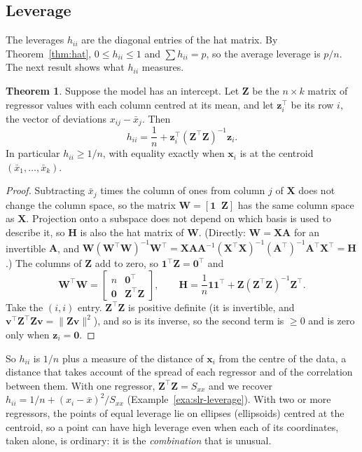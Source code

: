 \documentclass[11pt,a4paper]{article}
\numberwithin{equation}{section}
\theoremstyle{definition}
\newtheorem{thm}{Theorem}[subsection]
\begin{document}
\subsection{Leverage}
The leverages $h_{ii}$ are the diagonal entries of the hat matrix. By
Theorem~\ref{thm:hat}, $0 \le h_{ii} \le 1$ and $\sum h_{ii} = p$, so the average leverage
is $p/n$. The next result shows what $h_{ii}$ measures.

\begin{thm}\label{thm:centred-leverage}
Suppose the model has an intercept. Let $\mathbf{Z}$ be the $n \times k$ matrix of
regressor values with each column centred at its mean, and let $\mathbf{z}_i^\top$ be its
row $i$, the vector of deviations $x_{ij} - \bar x_j$. Then
\[
h_{ii} = \frac{1}{n} + \mathbf{z}_i^\top(\mathbf{Z}^\top\mathbf{Z})^{-1}\mathbf{z}_i .
\]
In particular $h_{ii} \ge 1/n$, with equality exactly when $\mathbf{x}_i$ is at the centroid
$(\bar x_1, \dots, \bar x_k)$.
\end{thm}

\begin{proof}
Subtracting $\bar x_j$ times the column of ones from column $j$ of $\mathbf{X}$ does not change
the column space, so the matrix $\mathbf{W} = [\mathbf{1} \;\; \mathbf{Z}]$ has the same column
space as $\mathbf{X}$. Projection onto a subspace does not depend on which basis is used to
describe it, so $\mathbf{H}$ is also the hat matrix of $\mathbf{W}$. (Directly: $\mathbf{W} = \mathbf{XA}$
for an invertible $\mathbf{A}$, and
$\mathbf{W}(\mathbf{W}^\top\mathbf{W})^{-1}\mathbf{W}^\top = \mathbf{XA}\mathbf{A}^{-1}(\mathbf{X}^\top\mathbf{X})^{-1}(\mathbf{A}^\top)^{-1}\mathbf{A}^\top\mathbf{X}^\top = \mathbf{H}$.)
The columns of $\mathbf{Z}$ add to zero, so $\mathbf{1}^\top\mathbf{Z} = \mathbf{0}^\top$ and
\[
\mathbf{W}^\top\mathbf{W} = \begin{bmatrix} n & \mathbf{0}^\top \\ \mathbf{0} & \mathbf{Z}^\top\mathbf{Z} \end{bmatrix},
\qquad
\mathbf{H} = \frac{1}{n}\mathbf{1}\mathbf{1}^\top + \mathbf{Z}(\mathbf{Z}^\top\mathbf{Z})^{-1}\mathbf{Z}^\top .
\]
Take the $(i,i)$ entry. $\mathbf{Z}^\top\mathbf{Z}$ is positive definite (it is invertible, and
$\mathbf{v}^\top\mathbf{Z}^\top\mathbf{Z}\mathbf{v} = \|\mathbf{Zv}\|^2$), and so is its inverse,
so the second term is $\ge 0$ and is zero only when $\mathbf{z}_i = \mathbf{0}$.
\end{proof}

So $h_{ii}$ is $1/n$ plus a measure of the distance of $\mathbf{x}_i$ from the centre of the
data, a distance that takes account of the spread of each regressor and of the correlation
between them. With one regressor, $\mathbf{Z}^\top\mathbf{Z} = S_{xx}$ and we recover
$h_{ii} = 1/n + (x_i - \bar x)^2/S_{xx}$ (Example~\ref{exa:slr-leverage}). With two or more
regressors, the points of equal leverage lie on ellipses (ellipsoids) centred at the
centroid, so a point can have high leverage even when each of its coordinates, taken alone,
is ordinary: it is the \emph{combination} that is unusual.
\end{document}
